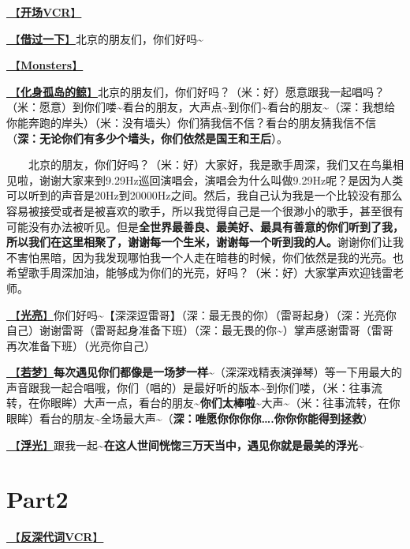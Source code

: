 \documentclass[]{ctexbook}
\begin{document}
\hyperref[opening-vcr]{🎥【\textbf{开场VCR}】}

\hyperref[I-will-go-my-way]{🎵【\textbf{借过一下}】}北京的朋友们，你们好吗\textasciitilde{}

\hyperref[Monsters]{🎵【\textbf{Monsters}】}

\hyperref[hua-shen-gu-dao-de-jing]{🎵【\textbf{化身孤岛的鲸}】}北京的朋友们，你们好吗？（米：好）愿意跟我一起唱吗？（米：愿意）到你们喽\textasciitilde 看台的朋友，大声点\textasciitilde 到你们\textasciitilde 看台的朋友\textasciitilde（深：我想给你能奔跑的岸头）（米：没有墙头）你们猜我信不信？看台的朋友猜我信不信（\textbf{深：无论你们有多少个墙头，你们依然是国王和王后}）。

  北京的朋友，你们好吗？（米：好）大家好，我是歌手周深，我们又在鸟巢相见啦，谢谢大家来到9.29Hz巡回演唱会，演唱会为什么叫做9.29Hz呢？是因为人类可以听到的声音是20Hz到20000Hz之间。然后，我自己认为我是一个比较没有那么容易被接受或者是被喜欢的歌手，所以我觉得自己是一个很渺小的歌手，甚至很有可能没有办法被听见。但是\textbf{全世界最善良、最美好、最具有善意的你们听到了我，所以我们在这里相聚了，谢谢每一个生米，谢谢每一个听到我的人。}谢谢你们让我不害怕黑暗，因为我发现哪怕我一个人走在暗巷的时候，你们依然是我的光亮。也希望歌手周深加油，能够成为你们的光亮，好吗？（米：好）大家掌声欢迎钱雷老师。

\hyperref[silver-linings]{🎵【\textbf{光亮}】}你们好吗\textasciitilde【深深逗雷哥】（深：最无畏的你）（雷哥起身）（深：光亮你自己）谢谢雷哥（雷哥起身准备下班）（深：最无畏的你\textasciitilde）掌声感谢雷哥（雷哥再次准备下班）（光亮你自己）

\hyperref[ruomeng]{🎵【\textbf{若梦}】}\textbf{每次遇见你们都像是一场梦一样\textasciitilde{}}（深深戏精表演弹琴）等一下用最大的声音跟我一起合唱哦，你们（唱的）是最好听的版本\textasciitilde 到你们喽，（米：往事流转，在你眼眸）大声一点，看台的朋友\textasciitilde{}\textbf{你们太棒啦\textasciitilde{}}大声\textasciitilde（米：往事流转，在你眼眸）看台的朋友\textasciitilde 全场最大声\textasciitilde（\textbf{深：唯愿你你你你\ldots.你你你能得到拯救}）

\hyperref[floating-light]{🎵【\textbf{浮光}】}跟我一起\textasciitilde{}\textbf{在这人世间恍惚三万天当中，遇见你就是最美的浮光\textasciitilde{}}

\section{Part2}\label{beijing-20240922-part2}

\hyperref[senself-vcr]{🎥【\textbf{反深代词VCR}】}
\end{document}
